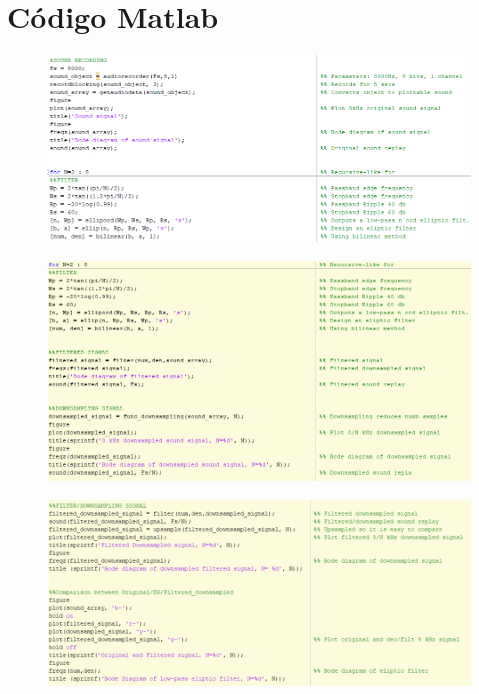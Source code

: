 \documentclass{article}
\begin{document}
\section{Código Matlab}    
\newpage
\begin{figure}[h]
\begin{center}
\includegraphics[width=19cm]{matlab_test_images/code_imgs/c1.PNG}
\end{center}
\end{figure}
\newpage
\begin{figure}[h]
\begin{center}
\includegraphics[width=19cm]{matlab_test_images/code_imgs/c2.png}
\end{center}
\end{figure}
\newpage
\begin{figure}[h]
\begin{center}
\includegraphics[width=19cm]{matlab_test_images/code_imgs/c3.png}
\end{center}
\end{figure}
\end{document}
